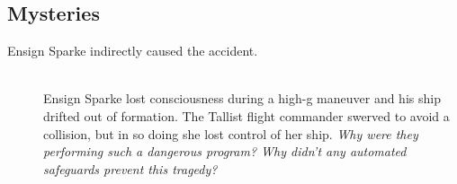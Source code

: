 \documentclass[11pt, a5paper, parskip=half-, DIV=12]{scrartcl}
\begin{document}
\subsection*{Mysteries}
\begin{description}
	\item[Ensign Sparke indirectly caused the accident.] \phantom{a} \\ %
	 Ensign Sparke lost consciousness during a high-g maneuver and his ship drifted out of formation.  The Tallist flight commander swerved to avoid a collision, but in so doing she lost control of her ship. \textit{Why were they performing such a dangerous program? Why didn't any automated safeguards prevent this tragedy?}
\end{description}

\newpage



\newpage

\thispagestyle{empty}


\ClearShipoutPicture
{}

\phantom{a}
\end{document}
